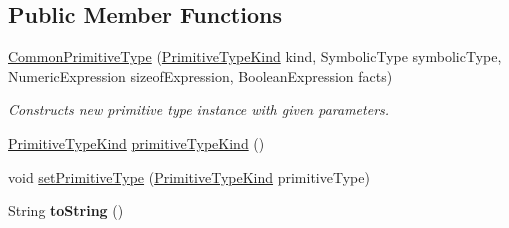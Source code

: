 \subsection*{Public Member Functions}
\begin{DoxyCompactItemize}
\item 
\hyperlink{classedu_1_1udel_1_1cis_1_1vsl_1_1civl_1_1model_1_1common_1_1type_1_1CommonPrimitiveType_a506e4d45324fa56925a072beab7d8692}{Common\+Primitive\+Type} (\hyperlink{enumedu_1_1udel_1_1cis_1_1vsl_1_1civl_1_1model_1_1IF_1_1type_1_1CIVLPrimitiveType_1_1PrimitiveTypeKind}{Primitive\+Type\+Kind} kind, Symbolic\+Type symbolic\+Type, Numeric\+Expression sizeof\+Expression, Boolean\+Expression facts)
\begin{DoxyCompactList}\small\item\em Constructs new primitive type instance with given parameters. \end{DoxyCompactList}\item 
\hyperlink{enumedu_1_1udel_1_1cis_1_1vsl_1_1civl_1_1model_1_1IF_1_1type_1_1CIVLPrimitiveType_1_1PrimitiveTypeKind}{Primitive\+Type\+Kind} \hyperlink{classedu_1_1udel_1_1cis_1_1vsl_1_1civl_1_1model_1_1common_1_1type_1_1CommonPrimitiveType_a7c594169f53a7bba0d734d27f17a9395}{primitive\+Type\+Kind} ()
\item 
void \hyperlink{classedu_1_1udel_1_1cis_1_1vsl_1_1civl_1_1model_1_1common_1_1type_1_1CommonPrimitiveType_aa9f8f985cb3dfb0077829d89ca1a7915}{set\+Primitive\+Type} (\hyperlink{enumedu_1_1udel_1_1cis_1_1vsl_1_1civl_1_1model_1_1IF_1_1type_1_1CIVLPrimitiveType_1_1PrimitiveTypeKind}{Primitive\+Type\+Kind} primitive\+Type)
\item 
\hypertarget{classedu_1_1udel_1_1cis_1_1vsl_1_1civl_1_1model_1_1common_1_1type_1_1CommonPrimitiveType_a6422c67ac55a0e5a12277f897380ef77}{}String {\bfseries to\+String} ()\label{classedu_1_1udel_1_1cis_1_1vsl_1_1civl_1_1model_1_1common_1_1type_1_1CommonPrimitiveType_a6422c67ac55a0e5a12277f897380ef77}


\end{DoxyCompactItemize}
